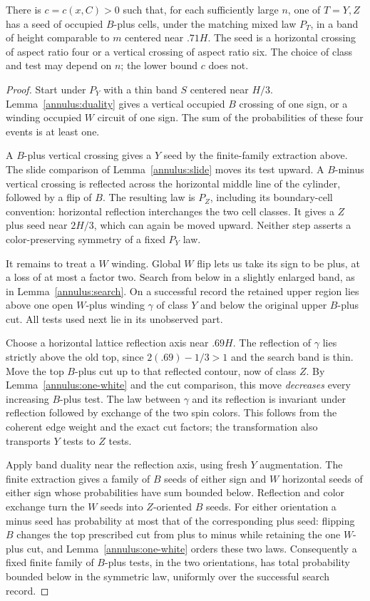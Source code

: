 \begin{lemma}\label{annulus:first-seed}
There is $c=c(x,C)>0$ such that, for each sufficiently large $n$, one of
$T=Y,Z$ has a seed of occupied $B$-plus cells, under the matching mixed
law $P_T$, in a band of height comparable to $m$ centered near $.71H$.
The seed is a horizontal crossing of aspect ratio four or a vertical
crossing of aspect ratio six.  The choice of class and test may depend
on $n$; the lower bound $c$ does not.
\end{lemma}
\begin{proof}
Start under $P_Y$ with a thin band $S$ centered near $H/3$.
Lemma~\ref{annulus:duality} gives a vertical occupied $B$ crossing of
one sign, or a winding occupied $W$ circuit of one sign.  The sum of
the probabilities of these four events is at least one.

A $B$-plus vertical crossing gives a $Y$ seed by the finite-family
extraction above.  The slide comparison of Lemma~\ref{annulus:slide}
moves its test upward.  A $B$-minus vertical crossing is reflected
across the horizontal middle line of the cylinder, followed by a flip
of $B$.  The resulting law is $P_Z$, including its boundary-cell
convention: horizontal reflection interchanges the two cell classes.
It gives a $Z$ plus seed near $2H/3$, which can again be moved upward.
Neither step asserts a color-preserving symmetry of a fixed $P_Y$ law.

It remains to treat a $W$ winding.  Global $W$ flip lets us take its
sign to be plus, at a loss of at most a factor two.  Search from below
in a slightly enlarged band, as in Lemma~\ref{annulus:search}.  On a
successful record the retained upper region lies above one open
$W$-plus winding $\gamma$ of class $Y$ and below the original upper
$B$-plus cut.  All tests used next lie in its unobserved part.

Choose a horizontal lattice reflection axis near $.69H$.  The reflection
of $\gamma$ lies strictly above the old top, since
$2(.69)-1/3>1$ and the search band is thin.  Move the top $B$-plus cut
up to that reflected contour, now of class $Z$.  By
Lemma~\ref{annulus:one-white} and the cut comparison, this move
\emph{decreases} every increasing $B$-plus test.  The law between
$\gamma$ and its reflection is invariant under reflection followed by
exchange of the two spin colors.  This follows from the coherent edge
weight and the exact cut factors; the transformation also transports
$Y$ tests to $Z$ tests.

Apply band duality near the reflection axis, using fresh $Y$
augmentation.  The finite extraction gives a family of $B$ seeds of
either sign and $W$ horizontal seeds of either sign whose probabilities
have sum bounded below.  Reflection and color exchange turn the $W$
seeds into $Z$-oriented $B$ seeds.  For either orientation a minus seed
has probability at most that of the corresponding plus seed: flipping
$B$ changes the top prescribed cut from plus to minus while retaining
the one $W$-plus cut, and Lemma~\ref{annulus:one-white} orders these
two laws.  Consequently a fixed finite family of $B$-plus tests, in the
two orientations, has total probability bounded below in the symmetric
law, uniformly over the successful search record.


\end{proof}

